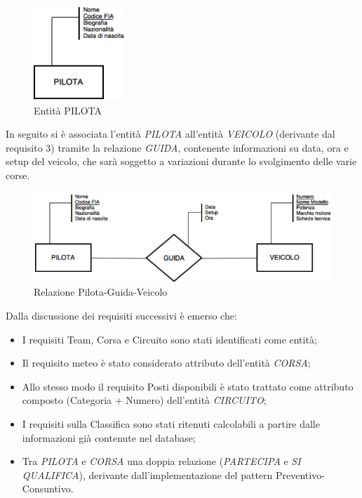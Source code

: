 \begin{center}
\begin{figure}[H]
\centering
\includegraphics[scale=1]{figures/pilot_entity.png}
\caption{Entità PILOTA} 
\end{figure}
\end{center}

In seguito si è associata l’entità \textit{PILOTA} all’entità \textit{VEICOLO} (derivante dal requisito 3) tramite la relazione \textit{GUIDA}, contenente informazioni su data, ora e setup del veicolo, che sarà soggetto a variazioni durante lo svolgimento delle varie corse.   

\begin{center}
\begin{figure}[H]
\centering
\includegraphics[scale=0.8]{figures/pilota_guida_veicolo.png}
\caption{Relazione Pilota-Guida-Veicolo} 
\end{figure}
\end{center}

Dalla discussione dei requisiti successivi è emerso che:

\begin{itemize}

\item I requisiti Team, Corsa e Circuito sono stati identificati come entità;
\item Il requisito meteo è stato considerato attributo dell’entità \textit{CORSA};
\item Allo stesso modo il requisito Posti disponibili è stato trattato come attributo composto (Categoria + Numero) dell’entità \textit{CIRCUITO};
\item I requisiti sulla Classifica sono stati ritenuti calcolabili a partire dalle informazioni già contenute nel database;
\item Tra \textit{PILOTA} e \textit{CORSA} una doppia relazione (\textit{PARTECIPA} e \textit{SI QUALIFICA}), derivante dall’implementazione del pattern Preventivo-Consuntivo.   

\end{itemize}

